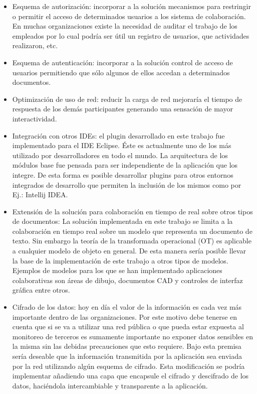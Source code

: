 \documentclass[12pt,a4paper]{article}
\begin{document}
\begin{itemize}
	\item Esquema de autorización: incorporar a la solución mecanismos para restringir o permitir el acceso de determinados
		usuarios a los sistema de colaboración. En muchas organizaciones existe la necesidad de auditar el trabajo de los empleados 
		por lo cual podría ser útil un registro de usuarios, que actividades realizaron, etc.

	\item Esquema de autenticación: incorporar a la solución control de acceso de usuarios permitiendo que sólo algunos
		de ellos accedan a determinados documentos.

	\item Optimización de uso de red: reducir la carga de red mejoraría el tiempo de respuesta de los demás participantes
		generando una sensación de mayor interactividad.

	\item Integración con otros IDEs: el plugin desarrollado en este trabajo fue implementado para el IDE Eclipse. Éste es
		actualmente uno de los más utilizado por desarrolladores en todo el mundo. La arquitectura de los módulos base fue pensada 
		para ser independiente de la aplicación que los integre. De esta forma es posible desarrollar plugins para otros entornos
		integrados de desarrollo que permiten la inclusión de los mismos como por Ej.: Intellij IDEA.

	\item Extensión de la solución para colaboración en tiempo de real sobre otros tipos de documentos:
		La solución implementada en este trabajo se limita a la colaboración en tiempo real sobre un modelo que representa un
		documento de texto. Sin embargo la teoría de la transformada operacional (OT) es aplicable a cualquier modelo de objeto en
		general. De esta manera sería posible llevar la base de la implementación de este trabajo a otros tipos de modelos. Ejemplos
		de modelos para los que se han implementado aplicaciones colaborativas son áreas de dibujo, documentos CAD y controles de
		interfaz gráfica entre otros.

	\item Cifrado de los datos: hoy en día el valor de la información es cada vez más importante dentro de las organizaciones. 
		Por este motivo debe tenerse en cuenta que si se va a utilizar una red pública o que pueda estar expuesta al monitoreo
		de terceros es sumamente importante no exponer datos sensibles en la misma sin las debidas precauciones que esto requiere.
		Bajo esta premisa sería deseable que la información transmitida por la aplicación sea enviada por la red utilizando algún
		esquema de cifrado. Esta modificación se podría implementar añadiendo una capa que encapsule el cifrado y descifrado de
		los datos, haciéndola intercambiable y transparente a la aplicación.


\end{itemize}
\end{document}
